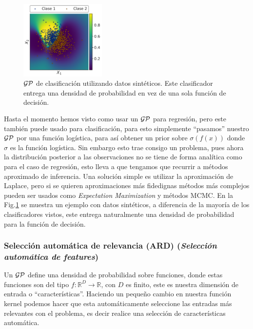 \begin{figure}
\includegraphics[width=0.38\textwidth]{img/cap6_gp_classificacion}
\caption{$\mathcal{GP}$ de clasificación utilizando datos sintéticos. Este clasificador entrega una densidad de probabilidad en vez de una sola función de decisión.}\label{fig:gp_8}
\end{figure} 

Hasta el momento hemos visto como usar un $\mathcal{GP}$ para regresión, pero este también puede usado para clasificación, para esto simplemente ``pasamos'' nuestro $\mathcal{GP}$ por una función logística, para así obtener un prior sobre $\sigma\left(f(x)\right)$ donde $\sigma$ es la función logística. Sin embargo esto trae consigo un problema, pues ahora la distribución posterior a las observaciones no se tiene de forma analítica como para el caso de regresión, esto lleva a que tengamos que recurrir a métodos aproximado de inferencia. Una solución simple es utilizar la aproximación de Laplace, pero si se quieren aproximaciones más fidedignas métodos más complejos pueden ser usados como \textit{Expectation Maximization} y métodos MCMC. En la Fig.\ref{fig:gp_8} se muestra un ejemplo con datos sintéticos, a diferencia de la mayoría de los clasificadores vistos, este entrega naturalmente una densidad de probabilidad para la función de decisión.\\



\subsubsection{Selección automática de relevancia (ARD) (\textit{Selección automática de features})}
Un $\mathcal{GP}$ define una densidad de probabilidad sobre funciones, donde estas funciones son del tipo $f: \mathbb{R}^D \rightarrow \mathbb{R}$, con $D$ es finito, este es nuestra dimensión de entrada o ``características''. Haciendo un pequeño cambio en nuestra función kernel podemos hacer que esta automáticamente seleccione las entradas más relevantes con el problema, es decir realice una selección de características automática.\\

